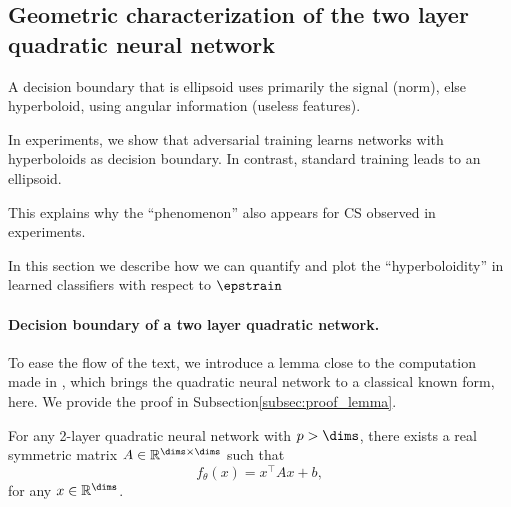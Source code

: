 \subsection{Geometric characterization of the two layer quadratic neural network}


A decision boundary that is ellipsoid uses primarily the signal (norm), else hyperboloid, using angular information (useless features).

In experiments, we show that adversarial training
learns networks with hyperboloids as decision boundary. In
contrast, standard training leads to an ellipsoid.

This explains why the ``phenomenon'' also appears for CS
observed in experiments.

In this section we describe how we can quantify and
plot the ``hyperboloidity'' in learned
classifiers with respect to $\epstrain$  



\paragraph{Decision boundary of a two layer quadratic network.} To ease the flow of the text, we introduce a lemma close to the computation made in \cite{gilmer18}, which brings the quadratic neural network to a classical known form, here. We provide the proof in Subsection\ref{subsec:proof_lemma}.
\begin{lemma}
\label{lem:quadratic_symm_matrix}
For any 2-layer quadratic neural network with $p>\dims$, there exists a real symmetric matrix $A \in \mathbb{R}^{\dims \times \dims}$ such that 
\begin{equation}
f_{\theta}(x) = x^{\top} A x + b,
\end{equation}
for any $x \in \mathbb{R}^{\dims}$.
\end{lemma}


